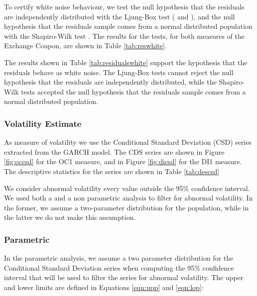 \documentclass[a4paper]{article}
\begin{document}








To certify white noise behaviour, we test the null hypothesis that the residuals are independently distributed with the Ljung-Box test (\citet{boxpierce} and \citet{ljungbox}), and the null hypothesis that the residuals sample comes from a normal distributed population with the Shapiro-Wilk test \citet{shapirowilk}. The results for the tests, for both measures of the Exchange Coupon, are shown in Table \ref{tab:reswhite}.



The results shown in Table \ref{tab:residualswhite} support the hypothesis that the residuals behave as white noise. The Ljung-Box tests cannot reject the null hypothesis that the residuals are independently distributed, while the Shapiro-Wilk tests accepted the null hypothesis that the residuals sample comes from a normal distributed population.

\subsubsection{Volatility Estimate}

As measure of volatility we use the Conditional Standard Deviation (CSD) series extracted from the GARCH model. The CDS series are shown in Figure \ref{fig:occsd} for the OC1 measure, and in Figure \ref{fig:dicsd} for the DI1 measure. The descriptive statistics for the series are shown in Table \ref{tab:descsd}







We consider abnormal volatility every value outside the 95\% confidence interval. We used both a  and a non parametric analysis to filter for abnormal volatility. In the former, we assume a two-parameter distribution for the population, while in the latter we do not make this assumption.

\subsubsection{Parametric}

In the parametric analysis, we assume a two parameter distribution for the Conditional Standard Deviation series when computing the 95\% confidence interval that will be used to filter the series for abnormal volatility. The upper and lower limits are defined in Equations \ref{eqn:upp} and \ref{eqn:lop}: 
\end{document}
